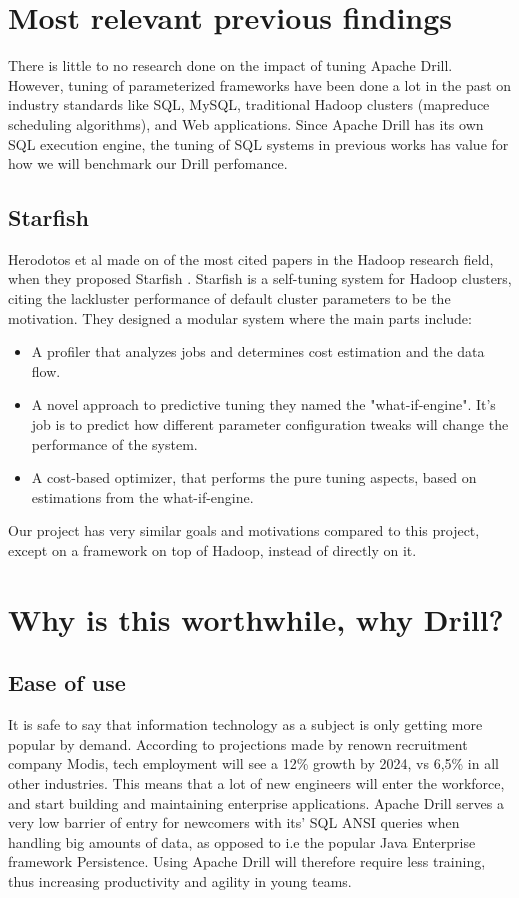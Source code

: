 \documentclass[a4paper,english]{report}
\begin{document}
		\section{Most relevant previous findings}
		There is little to no research done on the impact of tuning Apache Drill. However, tuning of parameterized frameworks have been done a lot in the past on industry standards like SQL, MySQL, traditional Hadoop clusters (mapreduce scheduling algorithms), and Web applications. Since Apache Drill has its own SQL execution engine,  the tuning of SQL systems in previous works has value for how we will benchmark our Drill perfomance.
			\subsection{Starfish}
			Herodotos et al made on of the most cited papers in the Hadoop research field, when they proposed Starfish \cite{starfish}. Starfish is a self-tuning system for Hadoop clusters, citing the lackluster performance of default cluster parameters to be the motivation. They designed a modular system where the main parts include:
			\begin{itemize}
				\item A profiler that analyzes jobs and determines cost estimation and the data flow.
				\item A novel approach to predictive tuning they named the "what-if-engine". It's job is to predict how different parameter configuration tweaks will change the performance of the system.
				\item A cost-based optimizer, that performs the pure tuning aspects, based on estimations from the what-if-engine.
			\end{itemize}
			Our project has very similar goals and motivations compared to this project, except on a framework on top of Hadoop, instead of directly on it.
		
		\section{Why is this worthwhile, why Drill?}
		\label{sec:why_drill}
			\subsection{Ease of use}It is safe to say that information technology as a subject is only getting more popular by demand. According to projections made by renown recruitment company Modis, tech employment will see a 12\% growth by 2024, vs 6,5\% in all other industries\cite{modis}. This means that a lot of new engineers will enter the workforce, and start building and maintaining enterprise applications. Apache Drill serves a very low barrier of entry for newcomers with its' SQL ANSI queries when handling big amounts of data, as opposed to i.e the popular Java Enterprise framework Persistence. Using Apache Drill will therefore require less training, thus increasing productivity and agility in young teams.
\end{document}
